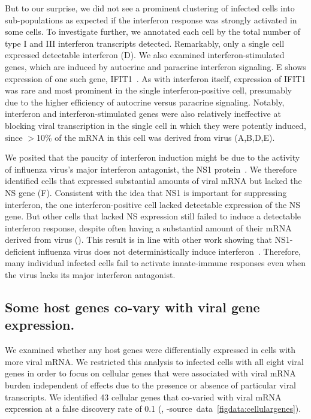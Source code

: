 \documentclass[9pt,lineno]{elife}
\begin{document}
But to our surprise, we did not see a prominent clustering of infected cells into sub-populations as expected if the interferon response was strongly activated in some cells.
To investigate further, we annotated each cell by the total number of type I and III interferon transcripts detected.
Remarkably, only a single cell expressed detectable interferon (D).
We also examined interferon-stimulated genes, which are induced by autocrine and paracrine interferon signaling.
E shows expression of one such gene, IFIT1~\citep{Fensterl:2011fp}.
As with interferon itself, expression of IFIT1 was rare and most prominent in the single interferon-positive cell, presumably due to the higher efficiency of autocrine versus paracrine signaling.
Notably, interferon and interferon-stimulated genes were also relatively ineffective at blocking viral transcription in the single cell in which they were potently induced, since $>$10\% of the mRNA in this cell was derived from virus (A,B,D,E).

We posited that the paucity of interferon induction might be due to the activity of influenza virus's major interferon antagonist, the NS1 protein~\citep{garcia1998influenza,hale2008multifunctional}.
We therefore identified cells that expressed substantial amounts of viral mRNA but lacked the NS gene (F).
Consistent with the idea that NS1 is important for suppressing interferon, the one interferon-positive cell lacked detectable expression of the NS gene.
But other cells that lacked NS expression still failed to induce a detectable interferon response, despite often having a substantial amount of their mRNA derived from virus ().
This result is in line with other work showing that NS1-deficient influenza virus does not deterministically induce interferon~\citep{Killip:2017ef,Kallfass:2013kp}.
Therefore, many individual infected cells fail to activate innate-immune responses even when the virus lacks its major interferon antagonist.

\subsection{Some host genes co-vary with viral gene expression.}
We examined whether any host genes were differentially expressed in cells with more viral mRNA.
We restricted this analysis to infected cells with all eight viral genes in order to focus on cellular genes that were associated with viral mRNA burden independent of effects due to the presence or absence of particular viral transcripts.
We identified 43 cellular genes that co-varied with viral mRNA expression at a false discovery rate of 0.1 (, -source~data~\ref{figdata:cellulargenes}).
\end{document}
